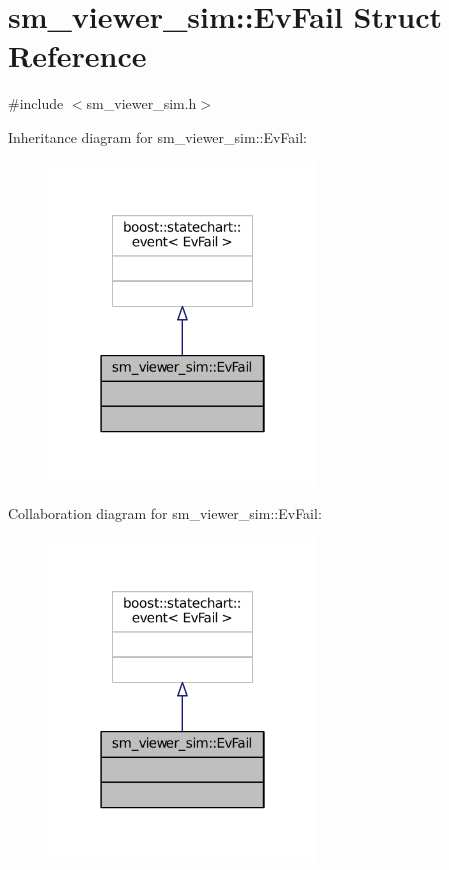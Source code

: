\hypertarget{structsm__viewer__sim_1_1EvFail}{}\section{sm\+\_\+viewer\+\_\+sim\+:\+:Ev\+Fail Struct Reference}
\label{structsm__viewer__sim_1_1EvFail}


{\ttfamily \#include $<$sm\+\_\+viewer\+\_\+sim.\+h$>$}



Inheritance diagram for sm\+\_\+viewer\+\_\+sim\+:\+:Ev\+Fail\+:
\nopagebreak
\begin{figure}[H]
\begin{center}
\leavevmode
\includegraphics[width=202pt]{structsm__viewer__sim_1_1EvFail__inherit__graph}
\end{center}
\end{figure}


Collaboration diagram for sm\+\_\+viewer\+\_\+sim\+:\+:Ev\+Fail\+:
\nopagebreak
\begin{figure}[H]
\begin{center}
\leavevmode
\includegraphics[width=202pt]{structsm__viewer__sim_1_1EvFail__coll__graph}
\end{center}
\end{figure}


